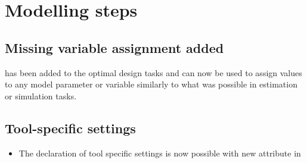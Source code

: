 %



\section{Modelling steps}
\label{sec:modelSteps}

\subsection{Missing variable assignment added}
 has been added to the optimal design tasks
and can now be used to assign values to any model parameter or
variable similarly to what was possible in estimation or simulation tasks.


\subsection{Tool-specific settings}

\begin{itemize}
\item
The declaration of tool specific settings is now possible with new  attribute in 
\end{itemize}

